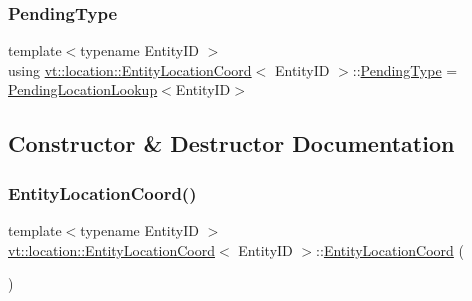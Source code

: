 \mbox{\label{structvt_1_1location_1_1_entity_location_coord_a41b5c3792967e089c7e592b705c266c3}} 
\subsubsection{\texorpdfstring{Pending\+Type}{PendingType}}
{\footnotesize\ttfamily template$<$typename Entity\+ID $>$ \\
using \hyperlink{structvt_1_1location_1_1_entity_location_coord}{vt\+::location\+::\+Entity\+Location\+Coord}$<$ Entity\+ID $>$\+::\hyperlink{structvt_1_1location_1_1_entity_location_coord_a41b5c3792967e089c7e592b705c266c3}{Pending\+Type} =  \hyperlink{structvt_1_1location_1_1_pending_location_lookup}{Pending\+Location\+Lookup}$<$Entity\+ID$>$}



\subsection{Constructor \& Destructor Documentation}
\mbox{\label{structvt_1_1location_1_1_entity_location_coord_a84d2166e5a2c192b081c222e15e93882}} 
\subsubsection{\texorpdfstring{Entity\+Location\+Coord()}{EntityLocationCoord()}\hspace{0.1cm}{\footnotesize\ttfamily [1/3]}}
{\footnotesize\ttfamily template$<$typename Entity\+ID $>$ \\
\hyperlink{structvt_1_1location_1_1_entity_location_coord}{vt\+::location\+::\+Entity\+Location\+Coord}$<$ Entity\+ID $>$\+::\hyperlink{structvt_1_1location_1_1_entity_location_coord}{Entity\+Location\+Coord} (\begin{DoxyParamCaption}{ }\end{DoxyParamCaption})}



